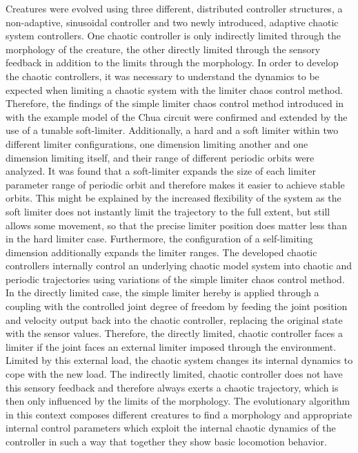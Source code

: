 \documentclass[main]{subfiles}
\begin{document}
Creatures were evolved using three different, distributed controller structures, a non-adaptive, sinusoidal controller and two newly introduced, adaptive chaotic system controllers. %
%
One chaotic controller is only indirectly limited through the morphology of the creature, the other directly limited through the sensory feedback in addition to the limits through the morphology. %
%
In order to develop the chaotic controllers, it was necessary to understand the dynamics to be expected when limiting a chaotic system with the limiter chaos control method. %
%
Therefore, the findings of the simple limiter chaos control method introduced in \cite{bib:Corron2000} with the example model of the Chua circuit \cite{bib:Matsumoto1985} were confirmed and extended by the use of a tunable soft-limiter. %
%
Additionally, a hard and a soft limiter within two different limiter configurations, one dimension limiting another and one dimension limiting itself, and their range of different periodic orbits were analyzed. %
%
It was found that a soft-limiter expands the size of each limiter parameter range of periodic orbit and therefore makes it easier to achieve stable orbits. %
%
This might be explained by the increased flexibility of the system as the soft limiter does not instantly limit the trajectory to the full extent, but still allows some movement, so that the precise limiter position does matter less than in the hard limiter case. %
%
Furthermore, the configuration of a self-limiting dimension additionally expands the limiter ranges. %
%
The developed chaotic controllers internally control an underlying chaotic model system into chaotic and periodic trajectories using variations of the simple limiter chaos control method. %
%
In the directly limited case, the simple limiter hereby is applied through a coupling with the controlled joint degree of freedom by feeding the joint position and velocity output back into the chaotic controller, replacing the original state with the sensor values. %
%
Therefore, the directly limited, chaotic controller faces a limiter if the joint faces an external limiter imposed through the environment. %
%
Limited by this external load, the chaotic system changes its internal dynamics to cope with the new load. %
%
The indirectly limited, chaotic controller does not have this sensory feedback and therefore always exerts a chaotic trajectory, which is then only influenced by the limits of the morphology. %
%
The evolutionary algorithm in this context composes different creatures to find a morphology and appropriate internal control parameters which exploit the internal chaotic dynamics of the controller in such a way that together they show basic locomotion behavior. %
\end{document}
